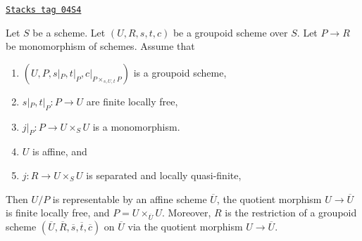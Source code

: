 \begin{lemma}
\label{bootstrap-lemma-divide-subgroupoid}
\href{https://stacks.math.columbia.edu/tag/04S4}{\texttt{Stacks tag 04S4}}

Let $S$ be a scheme.
Let $(U, R, s, t, c)$ be a groupoid scheme over $S$.
Let $P \to R$ be monomorphism of schemes. Assume that
\begin{enumerate}
\item $(U, P, s|_P, t|_P, c|_{P \times_{s, U, t}P})$ is a groupoid scheme,
\item $s|_P, t|_P : P \to U$ are finite locally free,
\item $j|_P : P \to U \times_S U$ is a monomorphism.
\item $U$ is affine, and
\item $j : R \to U \times_S U$ is separated and locally quasi-finite,
\end{enumerate}
Then $U/P$ is representable by an affine scheme $\overline{U}$, the
quotient morphism $U \to \overline{U}$ is finite locally free, and
$P = U \times_{\overline{U}} U$. Moreover, $R$ is the restriction of a
groupoid scheme
$(\overline{U}, \overline{R}, \overline{s}, \overline{t}, \overline{c})$
on $\overline{U}$ via the quotient morphism $U \to \overline{U}$.
\end{lemma}


